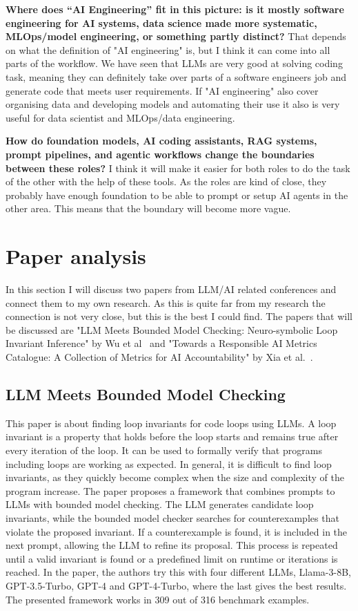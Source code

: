 \documentclass[a4paper, 11pt]{article}
\begin{document}
\textbf{Where does “AI Engineering” fit in this picture: is it mostly software engineering for AI systems, data science made more systematic, MLOps/model engineering, or something partly distinct?}
That depends on what the definition of "AI engineering" is, but I think it can come into all parts of the workflow. We have seen that LLMs are very good at solving coding task, meaning they can definitely take over parts of a software engineers job and generate code that meets user requirements. If "AI engineering" also cover organising data and developing models and automating their use it also is very useful for data scientist and MLOps/data engineering.

\textbf{How do foundation models, AI coding assistants, RAG systems, prompt pipelines, and agentic workflows change the boundaries between these roles?}
I think it will make it easier for both roles to do the task of the other with the help of these tools. As the roles are kind of close, they probably have enough foundation to be able to prompt or setup AI agents in the other area. This means that the boundary will become more vague. 

\section{Paper analysis}
In this section I will discuss two papers from LLM/AI related conferences and connect them to my own research. As this is quite far from my research the connection is not very close, but this is the best I could find. The papers that will be discussed are "LLM Meets Bounded Model Checking: Neuro-symbolic Loop Invariant Inference" by Wu et al~\cite{Wu} and "Towards a Responsible AI Metrics Catalogue: A Collection of
Metrics for AI Accountability" by Xia et al.~\cite{AIMetrics}.

\subsection{LLM Meets Bounded Model Checking}
This paper is about finding loop invariants for code loops using LLMs. A loop invariant is a property that holds before the loop starts and remains true after every iteration of the loop. It can be used to formally verify that programs including loops are working as expected. In general, it is difficult to find loop invariants, as they quickly become complex when the size and complexity of the program increase. The paper proposes a framework that combines prompts to LLMs with bounded model checking. The LLM generates candidate loop invariants, while the bounded model checker searches for counterexamples that violate the proposed invariant. If a counterexample is found, it is included in the next prompt, allowing the LLM to refine its proposal. This process is repeated until a valid invariant is found or a predefined limit on runtime or iterations is reached. In the paper, the authors try this with four different LLMs, Llama-3-8B, GPT-3.5-Turbo, GPT-4 and GPT-4-Turbo, where the last gives the best results. The presented framework works in 309 out of 316 benchmark examples. 
\end{document}
